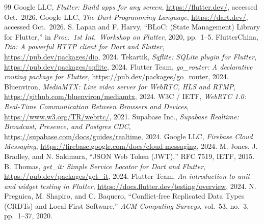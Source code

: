 \documentclass[conference,a4paper]{IEEEtran}
\begin{document}
\begin{IEEEkeywords}
\end{IEEEkeywords}










\begin{thebibliography}{99}
 Google LLC, \emph{Flutter: Build apps for any screen}, \url{https://flutter.dev/}, accessed Oct.\ 2026.
 Google LLC, \emph{The Dart Programming Language}, \url{https://dart.dev/}, accessed Oct.\ 2026.
 S. Lapan and F. Harvy, ``BLoC: (State Management) Library for Flutter,'' in \emph{Proc.\ 1st Int.\ Workshop on Flutter}, 2020, pp.\ 1--5.
 FlutterChina, \emph{Dio: A powerful HTTP client for Dart and Flutter}, \url{https://pub.dev/packages/dio}, 2024.
 Tekartik, \emph{Sqflite: SQLite plugin for Flutter}, \url{https://pub.dev/packages/sqflite}, 2024.
 Flutter Team, \emph{go\_router: A declarative routing package for Flutter}, \url{https://pub.dev/packages/go_router}, 2024.
 Bluenviron, \emph{MediaMTX: Live video server for WebRTC, HLS and RTMP}, \url{https://github.com/bluenviron/mediamtx}, 2024.
 W3C / IETF, \emph{WebRTC 1.0: Real-Time Communication Between Browsers and Devices}, \url{https://www.w3.org/TR/webrtc/}, 2021.
 Supabase Inc., \emph{Supabase Realtime: Broadcast, Presence, and Postgres CDC}, \url{https://supabase.com/docs/guides/realtime}, 2024.
 Google LLC, \emph{Firebase Cloud Messaging}, \url{https://firebase.google.com/docs/cloud-messaging}, 2024.
 M. Jones, J. Bradley, and N. Sakimura, ``JSON Web Token (JWT),'' RFC 7519, IETF, 2015.
 B. Thomas, \emph{get\_it: Simple Service Locator for Dart and Flutter}, \url{https://pub.dev/packages/get_it}, 2024.
 Flutter Team, \emph{An introduction to unit and widget testing in Flutter}, \url{https://docs.flutter.dev/testing/overview}, 2024.
 N. Preguica, M. Shapiro, and C. Baquero, ``Conflict-free Replicated Data Types (CRDTs) and Local-First Software,'' \emph{ACM Computing Surveys}, vol.\ 53, no.\ 3, pp.\ 1--37, 2020.
\end{thebibliography}


\end{document}
